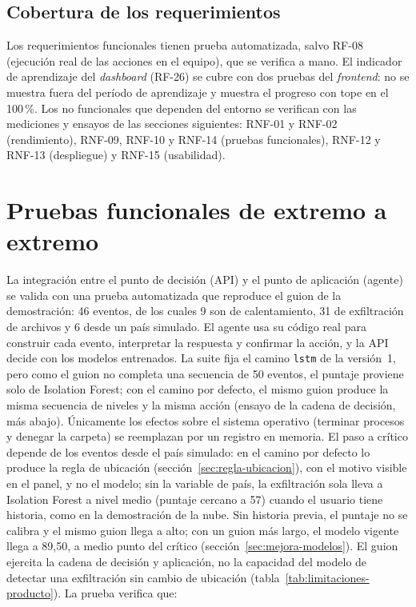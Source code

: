 \subsection{Cobertura de los requerimientos}
Los requerimientos funcionales tienen prueba automatizada, salvo RF-08 (ejecución real de las acciones en el equipo), que se verifica a mano. El indicador de aprendizaje del \emph{dashboard} (RF-26) se cubre con dos pruebas del \emph{frontend}: no se muestra fuera del período de aprendizaje y muestra el progreso con tope en el 100\,\%. Los no funcionales que dependen del entorno se verifican con las mediciones y ensayos de las secciones siguientes: RNF-01 y RNF-02 (rendimiento), RNF-09, RNF-10 y RNF-14 (pruebas funcionales), RNF-12 y RNF-13 (despliegue) y RNF-15 (usabilidad).

\section{Pruebas funcionales de extremo a extremo}
\label{sec:pruebas-e2e}
La integración entre el punto de decisión (API) y el punto de aplicación (agente) se valida con una prueba automatizada que reproduce el guion de la demostración: 46 eventos, de los cuales 9 son de calentamiento, 31 de exfiltración de archivos y 6 desde un país simulado. El agente usa su código real para construir cada evento, interpretar la respuesta y confirmar la acción, y la API decide con los modelos entrenados. La suite fija el camino \texttt{lstm} de la versión~1, pero como el guion no completa una secuencia de 50 eventos, el puntaje proviene solo de Isolation Forest; con el camino por defecto, el mismo guion produce la misma secuencia de niveles y la misma acción (ensayo de la cadena de decisión, más abajo). Únicamente los efectos sobre el sistema operativo (terminar procesos y denegar la carpeta) se reemplazan por un registro en memoria. El paso a crítico depende de los eventos desde el país simulado: en el camino por defecto lo produce la regla de ubicación (sección~\ref{sec:regla-ubicacion}), con el motivo visible en el panel, y no el modelo; sin la variable de país, la exfiltración sola lleva a Isolation Forest a nivel medio (puntaje cercano a 57) cuando el usuario tiene historia, como en la demostración de la nube. Sin historia previa, el puntaje no se calibra y el mismo guion llega a alto; con un guion más largo, el modelo vigente llega a 89,50, a medio punto del crítico (sección~\ref{sec:mejora-modelos}). El guion ejercita la cadena de decisión y aplicación, no la capacidad del modelo de detectar una exfiltración sin cambio de ubicación (tabla~\ref{tab:limitaciones-producto}). La prueba verifica que:
